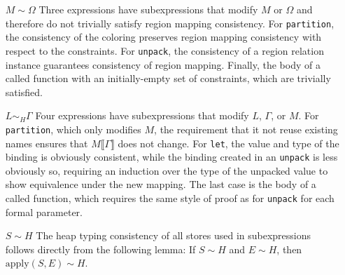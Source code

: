 \begin{itemize}

\item[$M \sim \Omega$] Three expressions have subexpressions that modify $M$ or $\Omega$ and therefore do not
trivially satisfy region mapping consistency.  For {\tt partition},
the consistency of the coloring preserves region mapping consistency
with respect to the constraints.  For {\tt unpack}, the consistency of
a region relation instance guarantees consistency of region mapping.
Finally, the body of a called function with an initially-empty set of
constraints, which are trivially satisfied.

\item[$L \sim_H \Gamma$] Four expressions have subexpressions that modify $L$, $\Gamma$, or $M$.  For
{\tt partition}, which only modifies $M$, the requirement that it not reuse existing
names ensures that $M \llbracket \Gamma \rrbracket$ does not change.  For {\tt let},
the value and type of the binding is obviously consistent, while the binding created in
an {\tt unpack} is less obviously so, requiring an induction over the type of the 
unpacked value to show equivalence under the new mapping.  The last case is the body of a
called function, which requires the same style of proof as for {\tt unpack} 
for each formal parameter.

\item[$S \sim H$] The heap typing consistency of all stores used in subexpressions follows directly from the following
lemma: If $S \sim H$ and $E \sim H$, then $\text{apply}(S, E) \sim H$.

\end{itemize}

